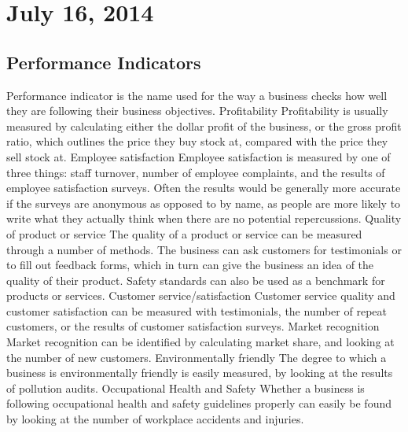 \section{July 16, 2014}

\subsection{Performance Indicators}
\begin{outline}
\1 Performance indicator is the name used for the way a business checks how well they are following their business objectives.
\2 Profitability
\3 Profitability is usually measured by calculating either the dollar profit of the business, or the gross profit ratio, which outlines the price they buy stock at, compared with the price they sell stock at.
\2 Employee satisfaction
\3 Employee satisfaction is measured by one of three things: staff turnover, number of employee complaints, and the results of employee satisfaction surveys. Often the results would be generally more accurate if the surveys are anonymous as opposed to by name, as people are more likely to write what they actually think when there are no potential repercussions.
\2 Quality of product or service
\3 The quality of a product or service can be measured through a number of methods. The business can ask customers for testimonials or to fill out feedback forms, which in turn can give the business an idea of the quality of their product. Safety standards can also be used as a benchmark for products or services.
\2 Customer service/satisfaction
\3 Customer service quality and customer satisfaction can be measured with testimonials, the number of repeat customers, or the results of customer satisfaction surveys.
\2 Market recognition
\3 Market recognition can be identified by calculating market share, and looking at the number of new customers.
\2 Environmentally friendly
\3 The degree to which a business is environmentally friendly is easily measured, by looking at the results of pollution audits.
\2 Occupational Health and Safety
\3 Whether a business is following occupational health and safety guidelines properly can easily be found by looking at the number of workplace accidents and injuries.
\end{outline}

